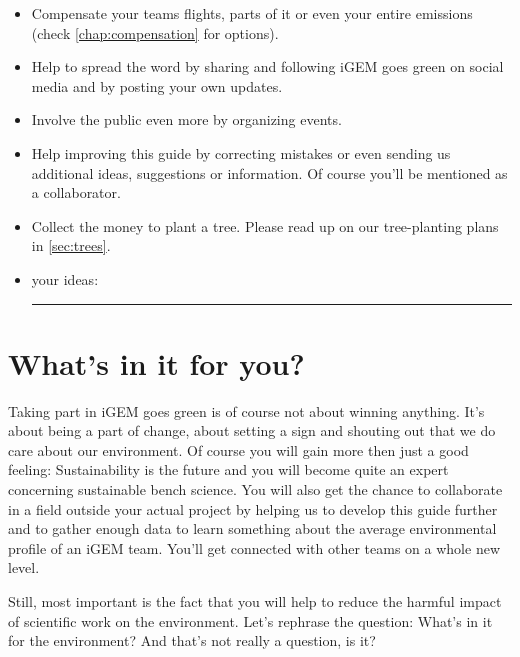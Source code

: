 {\begin{checklistbox}
\begin{itemize}
	\item Compensate your teams flights, parts of it or even your entire emissions (check \cref{chap:compensation} for options).
	\item Help to spread the word by sharing and following iGEM goes green on social media and by posting your own updates.
	\item Involve the public even more by organizing events.
	\item Help improving this guide by correcting mistakes or even sending us additional ideas, suggestions or information. Of course you'll be mentioned as a collaborator.
	\item Collect the money to plant a tree. Please read up on our tree-planting plans in \cref{sec:trees}.
	\item your ideas: {\leavevmode\leaders\hrule  height -1.9pt depth 2pt \hfill\kern0pt\relax}
\end{itemize}
\end{checklistbox}
}

\section{What's in it for you?}

Taking part in iGEM goes green is of course not about winning anything. It's about being a part of change, about setting a sign and shouting out that we do care about our environment. Of course you will gain more then just a good feeling: Sustainability is the future and you will become quite an expert concerning sustainable bench science. You will also get the chance to collaborate in a field outside your actual project by helping us to develop this guide further and to gather enough data to learn something about the average environmental profile of an iGEM team. You'll get connected with other teams on a whole new level.

Still, most important is the fact that you will help to reduce the harmful impact of scientific work on the environment. Let's rephrase the question: What's in it for the environment? And that's not really a question, is it?

